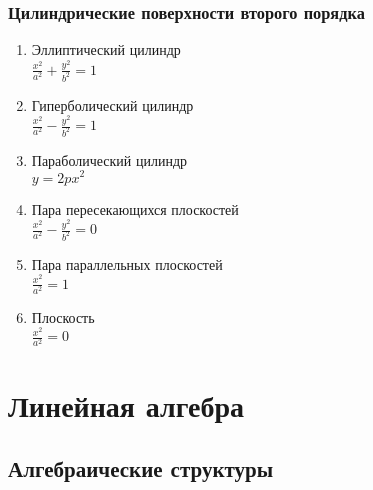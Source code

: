 \documentclass[12pt]{article}
\begin{document}
    \subsubsection{Цилиндрические поверхности второго порядка}
    \begin{enumerate}
        \item Эллиптический цилиндр\\
        $\frac{x^2}{a^2}+\frac{y^2}{b^2}=1$
        \item Гиперболический цилиндр\\
        $\frac{x^2}{a^2}-\frac{y^2}{b^2}=1$
        \item Параболический цилиндр\\
        $y=2px^2$
        \item Пара пересекающихся плоскостей\\
        $\frac{x^2}{a^2}-\frac{y^2}{b^2}=0$
        \item Пара параллельных плоскостей\\
        $\frac{x^2}{a^2}=1$
        \item Плоскость\\
        $\frac{x^2}{a^2}=0$
    \end{enumerate}

\section{Линейная алгебра}
\subsection{Алгебраические структуры}
\end{document}
